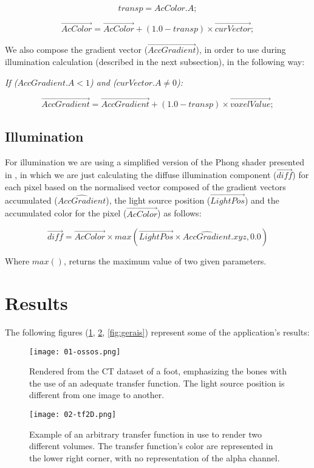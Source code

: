 \documentclass[10pt, conference]{IEEEtran}
\begin{document}
\[transp = AcColor.A;\]

\[\vec{AcColor} = \vec{AcColor} + (1.0 - transp) \times \vec{curVector};\]

We also compose the gradient vector (\(\vec{AccGradient}\)), in order to use  during illumination calculation (described in the next subsection), in the following way:

\textit{If (\(AccGradient.A < 1\)) and (\(curVector.A \neq 0\)):}


\[\vec{AccGradient} = \vec{AccGradient} + (1.0 - transp) \times \vec{voxelValue};\]


\subsection{Illumination}
\label{sec:ill}

For illumination we are using a simplified version of the Phong shader presented in \cite{RTVR}, in which we are just calculating the diffuse illumination component (\(\vec{diff}\)) for each pixel based on the normalised vector composed of the gradient vectors accumulated (\(\hat{AccGradient}\)), the light source position (\(\vec{LightPos}\)) and the accumulated color for the pixel (\(\vec{AcColor}\)) as follows:


\[\vec{diff} = \vec{AcColor} \times max(\vec{LightPos} \times \hat{AccGradient}.xyz, 0.0)\]

Where \(max()\), returns the maximum value of two given parameters.



\section{Results}
\label{sec:results}

The following figures (\ref{fig:bones}, \ref{fig:tf2D}, \ref{fig:gerais}) represent some of the application's results:

\begin{figure}[h]
\centering
\texttt{[image: 01-ossos.png]}
\caption{Rendered from the CT dataset of a foot, emphasizing the bones with the use of an adequate transfer function. The light source position is different from one image to another.}
\label{fig:bones}
\end{figure}

\begin{figure}[h]
\centering
\texttt{[image: 02-tf2D.png]}
\caption{Example of an arbitrary transfer function in use to render two different volumes. The transfer function's color are represented in the lower right corner, with no representation of the alpha channel.}
\label{fig:tf2D}
\end{figure}
\end{document}
